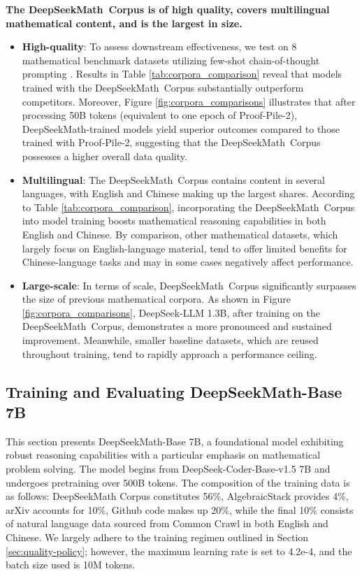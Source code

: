 \begin{itemize}[topsep=0pt]
\textbf{The DeepSeekMath~Corpus is of high quality, covers multilingual mathematical content, and is the largest in size.}

\begin{itemize}[topsep=0pt]
    \item \textbf{High-quality}:
    To assess downstream effectiveness, we test on 8 mathematical benchmark datasets utilizing few-shot chain-of-thought prompting \cite{cot}. Results in Table \ref{tab:corpora_comparison} reveal that models trained with the DeepSeekMath~Corpus substantially outperform competitors. Moreover, Figure \ref{fig:corpora_comparisons} illustrates that after processing 50B tokens (equivalent to one epoch of Proof-Pile-2), DeepSeekMath-trained models yield superior outcomes compared to those trained with Proof-Pile-2, suggesting that the DeepSeekMath~Corpus possesses a higher overall data quality.
    \item \textbf{Multilingual}:
    The DeepSeekMath~Corpus contains content in several languages, with English and Chinese making up the largest shares. According to Table \ref{tab:corpora_comparison}, incorporating the DeepSeekMath~Corpus into model training boosts mathematical reasoning capabilities in both English and Chinese. By comparison, other mathematical datasets, which largely focus on English-language material, tend to offer limited benefits for Chinese-language tasks and may in some cases negatively affect performance.
    \item \textbf{Large-scale}:
    In terms of scale, DeepSeekMath~Corpus significantly surpasses the size of previous mathematical corpora. As shown in Figure \ref{fig:corpora_comparisons}, DeepSeek-LLM 1.3B, after training on the DeepSeekMath~Corpus, demonstrates a more pronounced and sustained improvement. Meanwhile, smaller baseline datasets, which are reused throughout training, tend to rapidly approach a performance ceiling.
\end{itemize}

\subsection{Training and Evaluating DeepSeekMath-Base 7B}

This section presents DeepSeekMath-Base 7B, a foundational model exhibiting robust reasoning capabilities with a particular emphasis on mathematical problem solving. The model begins from DeepSeek-Coder-Base-v1.5 7B \citep{deepseek-coder} and undergoes pretraining over 500B tokens. The composition of the training data is as follows: DeepSeekMath Corpus constitutes 56\%, AlgebraicStack provides 4\%, arXiv accounts for 10\%, Github code makes up 20\%, while the final 10\% consists of natural language data sourced from Common Crawl in both English and Chinese. We largely adhere to the training regimen outlined in Section \ref{sec:quality-policy}; however, the maximum learning rate is set to 4.2e-4, and the batch size used is 10M tokens.


\end{itemize}
